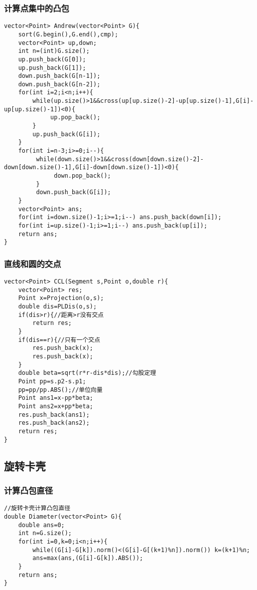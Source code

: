 \documentclass[twocolumn,a4]{article}
\begin{document}
\subsubsection{计算点集中的凸包}
\begin{lstlisting}
vector<Point> Andrew(vector<Point> G){
    sort(G.begin(),G.end(),cmp);
    vector<Point> up,down;
    int n=(int)G.size();
    up.push_back(G[0]);
    up.push_back(G[1]);
    down.push_back(G[n-1]);
    down.push_back(G[n-2]);
    for(int i=2;i<n;i++){
        while(up.size()>1&&cross(up[up.size()-2]-up[up.size()-1],G[i]-up[up.size()-1])<0){
             up.pop_back();
        }
        up.push_back(G[i]);
    }
    for(int i=n-3;i>=0;i--){
         while(down.size()>1&&cross(down[down.size()-2]-down[down.size()-1],G[i]-down[down.size()-1])<0){
              down.pop_back();
         }
         down.push_back(G[i]);       
    }
    vector<Point> ans;
    for(int i=down.size()-1;i>=1;i--) ans.push_back(down[i]);
    for(int i=up.size()-1;i>=1;i--) ans.push_back(up[i]);
    return ans;
}
\end{lstlisting}
\subsubsection{直线和圆的交点}
\begin{lstlisting}
vector<Point> CCL(Segment s,Point o,double r){
    vector<Point> res;
    Point x=Projection(o,s);
    double dis=PLDis(o,s);
    if(dis>r){//距离>r没有交点
        return res;
    }
    if(dis==r){//只有一个交点
        res.push_back(x);
        res.push_back(x);
    }
    double beta=sqrt(r*r-dis*dis);//勾股定理
    Point pp=s.p2-s.p1;
    pp=pp/pp.ABS();//单位向量
    Point ans1=x-pp*beta;
    Point ans2=x+pp*beta;
    res.push_back(ans1);
    res.push_back(ans2);
    return res;
}
\end{lstlisting}
\subsection{旋转卡壳}
\subsubsection{计算凸包直径}
\begin{lstlisting}
//旋转卡壳计算凸包直径
double Diameter(vector<Point> G){
    double ans=0;
    int n=G.size();
    for(int i=0,k=0;i<n;i++){
        while((G[i]-G[k]).norm()<(G[i]-G[(k+1)%n]).norm()) k=(k+1)%n;
        ans=max(ans,(G[i]-G[k]).ABS());
    }
    return ans;
}
\end{lstlisting}
\end{document}
